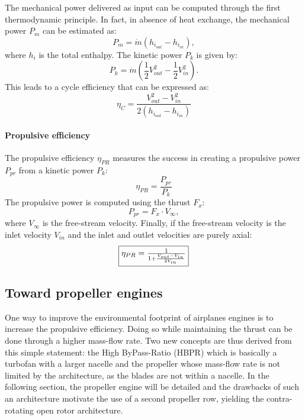 The mechanical power delivered as input
can be computed through the first thermodynamic principle. In fact, in absence
of heat exchange, the mechanical power $P_m$ can be estimated as:
\begin{equation}
	P_m = \dot{m} (h_{i_{out}} - h_{i_{in}}),
\end{equation}
where $h_i$ is the total enthalpy.
The kinetic power $P_k$ is given by:
\begin{equation}
	P_k = \dot{m} \left(\frac{1}{2} V^2_{out} -
	\frac{1}{2} V^2_{in} \right).
\end{equation}
This leads to a cycle efficiency that can be expressed as:
\begin{equation}
	\eta_{C} = \frac{V^2_{out} - V^2_{in}}{2 (h_{i_{out}} - h_{i_{in}})}
\end{equation}

\paragraph{Propulsive efficiency}
The propulsive efficiency $\eta_{PR}$ measures the success
in creating a propulsive power $P_{pr}$ from a
kinetic power $P_k$:
\begin{equation}
	\eta_{PR} = \frac{P_{pr}}{P_k}
\end{equation}
The propulsive power is computed using the thrust $F_x$:
\begin{equation}
	P_{pr} = F_x \cdot V_{\infty},
\end{equation}
where $V_{\infty}$ is the free-stream velocity.
Finally, if the free-stream velocity is the inlet velocity $V_{in}$
and the inlet and outlet velocities are purely axial:
\begin{equation}
	\fbox{$
	\eta_{PR} = \frac{1}{1 + \frac{V_{out} - V_{in}}{2 V_{in}}}
	$}
	\label{eq:cror_propulsive_efficiency}
\end{equation}

\subsection{Toward propeller engines}
\label{sub:cror_toward_propeller}

One way to improve the environmental footprint of
airplanes engines is to increase the propulsive efficiency.
Doing so while maintaining the thrust can be done through
a higher mass-flow rate. Two new concepts are thus derived from
this simple statement: the High ByPass-Ratio (HBPR) which
is basically a turbofan with a larger nacelle and the
propeller whose mass-flow rate is not limited
by the architecture, as the blades are not within a nacelle.
In the following section, the propeller engine will be detailed
and the drawbacks of such an architecture motivate the use
of a second propeller row, yielding the contra-rotating open rotor
architecture.


